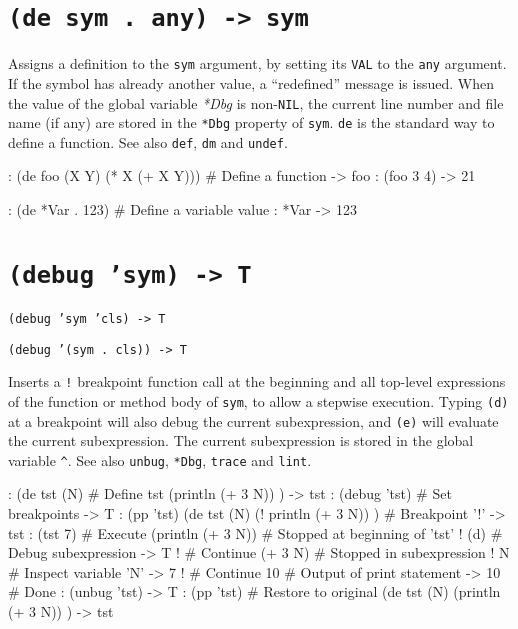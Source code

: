 { 
\section*{\texttt{(de sym . any) -> sym}}
\label{sec:func-ref-D-(de sym . any) -> sym}


Assigns a definition to the \texttt{sym} argument, by setting its \texttt{VAL} to the
\texttt{any} argument. If the symbol has already another value, a ``redefined''
message is issued. When the value of the global variable
\emph{*Dbg} is non-\texttt{NIL}, the current line number and file
name (if any) are stored in the \texttt{*Dbg} property of \texttt{sym}. \texttt{de} is the
standard way to define a function. See also \texttt{def}, \texttt{dm} and \texttt{undef}.


\begin{wideverbatim}
: (de foo (X Y) (* X (+ X Y)))  # Define a function
-> foo
: (foo 3 4)
-> 21

: (de *Var . 123)  # Define a variable value
: *Var
-> 123
\end{wideverbatim}

 
\section*{\texttt{(debug 'sym) -> T}}
\label{sec:func-ref-D-(debug 'sym) -> T}


\texttt{(debug 'sym 'cls) -> T}

\texttt{(debug '(sym . cls)) -> T}

Inserts a \texttt{!} breakpoint function call at the beginning and all
top-level expressions of the function or method body of \texttt{sym}, to allow
a stepwise execution. Typing \texttt{(d)} at a breakpoint will also debug the
current subexpression, and \texttt{(e)} will evaluate the current
subexpression. The current subexpression is stored in the global
variable \texttt{\textasciicircum{}}. See also \texttt{unbug}, \texttt{*Dbg}, \texttt{trace} and \texttt{lint}.


\begin{wideverbatim}
: (de tst (N)                    # Define tst
   (println (+ 3 N)) )
-> tst
: (debug 'tst)                   # Set breakpoints
-> T
: (pp 'tst)
(de tst (N)
   (! println (+ 3 N)) )         # Breakpoint '!'
-> tst
: (tst 7)                        # Execute
(println (+ 3 N))                # Stopped at beginning of 'tst'
! (d)                            # Debug subexpression
-> T
!                                # Continue
(+ 3 N)                          # Stopped in subexpression
! N                              # Inspect variable 'N'
-> 7
!                                # Continue
10                               # Output of print statement
-> 10                            # Done
: (unbug 'tst)
-> T
: (pp 'tst)                      # Restore to original
(de tst (N)
   (println (+ 3 N)) )
-> tst
\end{wideverbatim}

}
